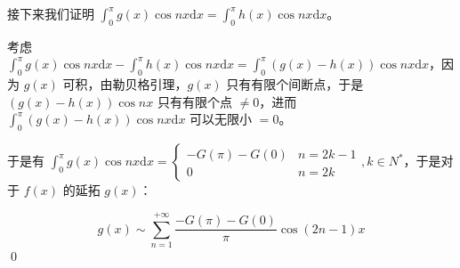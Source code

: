 接下来我们证明 $\displaystyle \int _{0}^{\pi } g( x)\cos nx\mathrm{d} x=\int _{0}^{\pi } h( x)\cos nx\mathrm{d} x$。

考虑 $\displaystyle \int _{0}^{\pi } g( x)\cos nx\mathrm{d} x-\int _{0}^{\pi } h( x)\cos nx\mathrm{d} x=\int _{0}^{\pi }( g( x) -h( x))\cos nx\mathrm{d} x$，因为 $\displaystyle g( x)$ 可积，由勒贝格引理，$\displaystyle g( x)$ 只有有限个间断点，于是 $\displaystyle ( g( x) -h( x))\cos nx$ 只有有限个点 $\displaystyle \neq 0$，进而 $\displaystyle \int _{0}^{\pi }( g( x) -h( x))\cos nx\mathrm{d} x$ 可以无限小 $\displaystyle =0$。

于是有 $\displaystyle \int _{0}^{\pi } g( x)\cos nx\mathrm{d} x=\begin{cases}
	-G( \pi ) -G( 0) & n=2k-1\\
	0 & n=2k
\end{cases} ,k\in N^{*}$，于是对于 $\displaystyle f( x)$ 的延拓 $\displaystyle g( x)$：


\begin{equation*}
	g( x) \sim \sum _{n=1}^{+\infty }\frac{-G( \pi ) -G( 0)}{\pi }\cos( 2n-1) x
\end{equation*}
\qed 
\ifx\allfiles\undefined

\fi